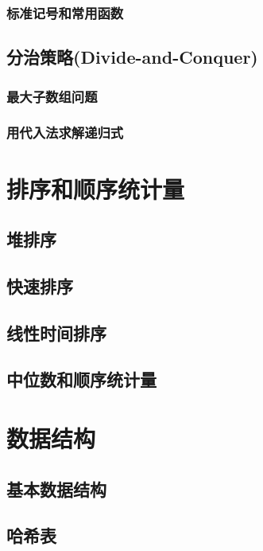 \documentclass[oneside,10pt,fontset=none]{ctexbook}
\numberwithin{definition}{chapter}
\numberwithin{theorem}{chapter}
\numberwithin{proof}{chapter}
\begin{document}
\section{标准记号和常用函数}

\chapter{分治策略(Divide-and-Conquer)}

\section{最大子数组问题}

\section{用代入法求解递归式}



\part{排序和顺序统计量}

\chapter{堆排序}

\chapter{快速排序}

\chapter{线性时间排序}

\chapter{中位数和顺序统计量}

\part{数据结构}

\chapter{基本数据结构}

\chapter{哈希表}
\end{document}

